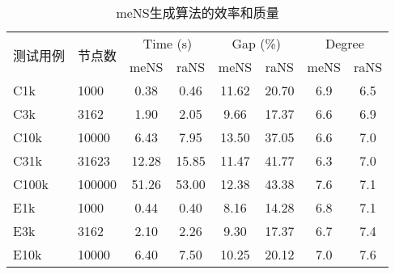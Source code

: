 \begin{table}[htbp]
    \centering
    \caption{meNS生成算法的效率和质量 \label{tab:meNS生成算法的效率和质量}}
    \begin{threeparttable}
        \begin{tabular}{ll|cc|cc|cc}
            \toprule
            \multirow{2}[4]{*}{测试用例} & \multirow{2}[4]{*}{节点数} & \multicolumn{2}{c}{Time (s)} & \multicolumn{2}{c}{Gap (\%)} & \multicolumn{2}{c}{Degree}                          \\
            \cmidrule{3-8}               &                            & meNS                         & raNS                       & meNS                       & raNS  & meNS & raNS  \\
            \midrule
            C1k                      & 1000                       & 0.38                         & 0.46                         & 11.62                      & 20.70  & 6.9  & 6.5    \\
            C3k                        & 3162                       & 1.90                         & 2.05                         & 9.66                       & 17.37  & 6.6  & 6.9    \\
            C10k                       & 10000                      & 6.43                         & 7.95                         & 13.50                      & 37.05  & 6.6  & 7.0    \\
            C31k                       & 31623                      & 12.28                        & 15.85                        & 11.47                      & 41.77  & 6.3  & 7.0    \\
            C100k                      & 100000                     & 51.26                        & 53.00                        & 12.38                      & 43.38  & 7.6  & 7.1    \\
            \midrule
            E1k                       & 1000                       & 0.44                         & 0.40                         & 8.16                       & 14.28  & 6.8  & 7.1    \\
            E3k                        & 3162                       & 2.10                         & 2.26                         & 9.30                       & 17.37  & 6.7  & 7.4    \\
            E10k                       & 10000                      & 6.40                         & 7.50                         & 10.25                      & 20.12  & 7.0  & 7.6    \\

\end{tabular}
\end{threeparttable}
\end{table}
